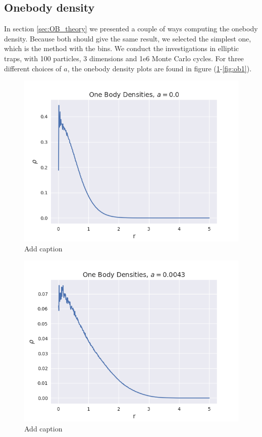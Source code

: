 \documentclass[norsk,a4paper,12pt]{article}
\begin{document}
\subsection{Onebody density}
In section \ref{sec:OB_theory} we presented a couple of ways computing the onebody density. Because both should give the same result, we selected the simplest one, which is the method with the bins. We conduct the investigations in elliptic traps, with 100 particles, 3 dimensions and 1e6 Monte Carlo cycles. For three different choices of $a$, the onebody density plots are found in figure (\ref{fig:ob0}-\ref{fig:ob1}).

\begin{figure} [H]
    \centering
    \includegraphics[scale=0.65]{images/ob_a_0.png}
    \caption{Add caption}
    \label{fig:ob0}
\end{figure} 

\begin{figure} [H]
    \centering
    \includegraphics[scale=0.65]{images/ob_a_00043.png}
    \caption{Add caption}
    \label{fig:ob00043}
\end{figure} 
\end{document}
